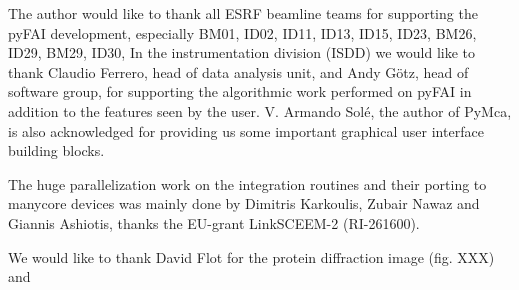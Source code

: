 \documentclass[preprint]{iucr}
\begin{document}
The author would like to thank all ESRF beamline teams for supporting the pyFAI
development, especially BM01, ID02, ID11, ID13, ID15, ID23, BM26, ID29, BM29,
ID30, In the instrumentation division (ISDD) we would like to thank Claudio Ferrero,
head of data analysis unit, and Andy G\"otz, head of software group, for
supporting the algorithmic work performed on pyFAI in addition to the features
seen by the user.
V. Armando Solé, the author of PyMca, is also acknowledged for providing us some
important graphical user interface building blocks.
  
The huge parallelization work on the integration routines and their porting to
manycore devices was mainly done by Dimitris Karkoulis, Zubair Nawaz and Giannis Ashiotis,
thanks the EU-grant LinkSCEEM-2 (RI-261600).

We would like to thank David Flot for the protein diffraction image (fig. XXX)
and 
\end{document}

